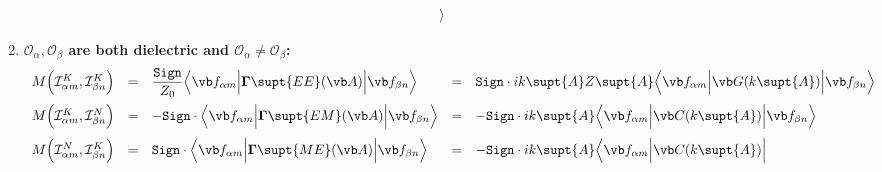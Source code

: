 \begin{enumerate}
$$\begin{array}{lclcl}
{                  \Big\rangle
               }
\end{array}$$
\item \textbf{ $\mathcal{O}_\alpha, \mathcal{O}_\beta$ are both
               dielectric and $\mathcal{O}_\alpha \ne \mathcal{O}_\beta$:}
$$\begin{array}{lclcl}
 M\Big( \mathcal{I}^K_{\alpha m}, \mathcal{I}^K_{\beta n} \Big) 
  &=& 
  \displaystyle{ \frac{\texttt{Sign}}{Z_0} 
                 \Big\langle \vb f_{\alpha m} 
                 \Big| \BG\supt{EE}(\vb A) \Big|
                 \vb f_{\beta n} 
                 \Big\rangle
               }
  &=&
  \displaystyle{ \texttt{Sign}\cdot ik\supt{A} Z\supt{A}
                 \Big\langle \vb f_{\alpha m} 
                 \Big| \vb G(k\supt{A}) \Big|
                 \vb f_{\beta n} 
                 \Big\rangle
               }
\\[10pt]
 M\Big( \mathcal{I}^K_{\alpha m}, \mathcal{I}^N_{\beta n} \Big) 
  &=&
  \displaystyle{ -\texttt{Sign}\cdot
                 \Big\langle 
                 \vb f_{\alpha m} 
                 \Big|\BG\supt{EM}(\vb A) \Big|
                 \vb f_{\beta n} 
                 \Big\rangle
               }
  &=&
  \displaystyle{ -\texttt{Sign}\cdot ik\supt{A}
                  \Big\langle 
                  \vb f_{\alpha m} 
                  \Big| \vb C(k\supt{A})\Big|
                  \vb f_{\beta n} 
                  \Big\rangle
               }
\\[10pt]
 M\Big( \mathcal{I}^N_{\alpha m}, \mathcal{I}^K_{\beta n} \Big) 
  &=&
  \displaystyle{ \texttt{Sign}\cdot
                 \Big\langle 
                 \vb f_{\alpha m} 
                 \Big|\BG\supt{ME}(\vb A) \Big|
                 \vb f_{\beta n} 
                 \Big\rangle
               }
  &=&
  \displaystyle{ -\texttt{Sign}\cdot ik\supt{A}
                  \Big\langle 
                  \vb f_{\alpha m} 
                  \Big| \vb C(k\supt{A})\Big|
}
\end{array}$$
\end{enumerate}

